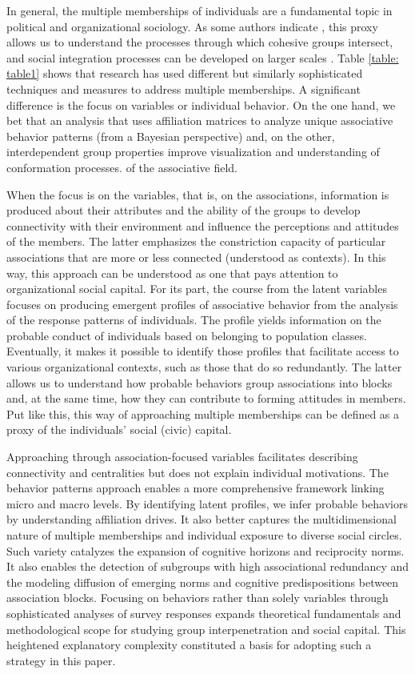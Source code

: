 \bigskip

In general, the multiple memberships of individuals are a fundamental topic in political and organizational sociology. As some authors indicate \parencite{friedkin_social_2004,moody_structural_2003}, this proxy allows us to understand the processes through which cohesive groups intersect, and social integration processes can be developed on larger scales \parencite{blau_inequality_1977}. Table \ref{table: table1} shows that research has used different but similarly sophisticated techniques and measures to address multiple memberships. A significant difference is the focus on variables or individual behavior. On the one hand, we bet that an analysis that uses affiliation matrices to analyze unique associative behavior patterns (from a Bayesian perspective) and, on the other, interdependent group properties improve visualization and understanding of conformation processes. of the associative field.
\bigskip

When the focus is on the variables, that is, on the associations, information is produced about their attributes and the ability of the groups to develop connectivity with their environment and influence the perceptions and attitudes of the members. The latter emphasizes the constriction capacity of particular associations that are more or less connected (understood as contexts). In this way, this approach can be understood as one that pays attention to organizational social capital. For its part, the course from the latent variables focuses on producing emergent profiles of associative behavior from the analysis of the response patterns of individuals. The profile yields information on the probable conduct of individuals based on belonging to population classes. Eventually, it makes it possible to identify those profiles that facilitate access to various organizational contexts, such as those that do so redundantly. The latter allows us to understand how probable behaviors group associations into blocks and, at the same time, how they can contribute to forming attitudes in members. Put like this, this way of approaching multiple memberships can be defined as a proxy of the individuals' social (civic) capital.
\bigskip

Approaching through association-focused variables facilitates describing connectivity and centralities but does not explain individual motivations. The behavior patterns approach enables a more comprehensive framework linking micro and macro levels. By identifying latent profiles, we infer probable behaviors by understanding affiliation drives. It also better captures the multidimensional nature of multiple memberships and individual exposure to diverse social circles. Such variety catalyzes the expansion of cognitive horizons and reciprocity norms. It also enables the detection of subgroups with high associational redundancy and the modeling diffusion of emerging norms and cognitive predispositions between association blocks. Focusing on behaviors rather than solely variables through sophisticated analyses of survey responses expands theoretical fundamentals and methodological scope for studying group interpenetration and social capital. This heightened explanatory complexity constituted a basis for adopting such a strategy in this paper.

